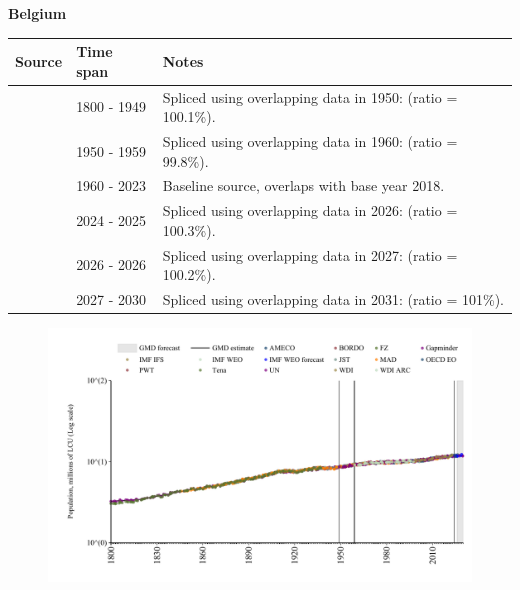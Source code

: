 \documentclass[12pt,a4paper,landscape]{article}
\begin{document}
\begin{adjustbox}{max totalsize={\paperwidth}{\paperheight},center}
\begin{minipage}[t][\textheight][t]{\textwidth}
\vspace*{0.5cm}
{}
\begin{center}
{\Large\bfseries Belgium}
\end{center}
\vspace{0.5cm}
\begin{table}[H]
\centering
\small
\begin{tabular}{|l|l|l|}
\hline
\textbf{Source} & \textbf{Time span} & \textbf{Notes} \\
\hline
\rowcolor{white}\cite{Gapminder}& 1800 - 1949 &Spliced using overlapping data in 1950: (ratio = 100.1\%).\\
\rowcolor{lightgray}\cite{IMF_IFS}& 1950 - 1959 &Spliced using overlapping data in 1960: (ratio = 99.8\%).\\
\rowcolor{white}\cite{WDI}& 1960 - 2023 &Baseline source, overlaps with base year 2018.\\
\rowcolor{lightgray}\cite{OECD_EO}& 2024 - 2025 &Spliced using overlapping data in 2026: (ratio = 100.3\%).\\
\rowcolor{white}\cite{AMECO}& 2026 - 2026 &Spliced using overlapping data in 2027: (ratio = 100.2\%).\\
\rowcolor{lightgray}\cite{Gapminder}& 2027 - 2030 &Spliced using overlapping data in 2031: (ratio = 101\%).\\
\hline
\end{tabular}
\end{table}
\begin{figure}[H]
\centering
\includegraphics[width=\textwidth,height=0.6\textheight,keepaspectratio]{graphs/BEL_pop.pdf}
\end{figure}
\end{minipage}
\end{adjustbox}
\end{document}
